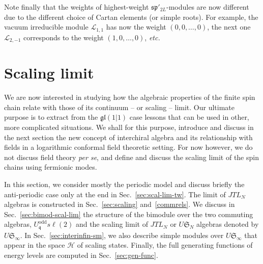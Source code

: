 \documentclass[11pt]{article}
\newcommand{\q}{\mathfrak{q}}
\newcommand{\JTL}[1]{JTL_{#1}}
\newcommand{\LQGodd}{U^{\text{odd}}_{\q} s\ell(2)}
\newcommand{\Hilb}{\mathcal{H}}
\newcommand{\interLie}{\mathfrak{S}}
\newcommand{\interfin}[1]{\interLie_{#1}}
\newcommand{\interinfin}{\interLie_{\infty}}
\newcommand{\gl}{\mathfrak{gl}}
\newcommand{\ssp}{\mathfrak{sp}}
\newcommand{\AIrrTL}[2]{\mathscr{L}_{#1,#2}}
\theoremstyle{definition}
\begin{document}
Note finally that the weights of highest-weight $\ssp'_{2L}$-modules are now different due to the different choice of Cartan elements (or simple roots). For example, the vacuum irreducible module $\AIrrTL{1}{1}$  has now  the weight $(0,0,\dots,0)$, the next one $\AIrrTL{2}{-1}$ corresponds to the weight $(1,0,\dots,0)$, {\it etc.}


\section{Scaling limit}\label{sec:scal-lim}

We are now interested in studying how the algebraic properties of the finite spin chain relate with those of its continuum -- or scaling --  limit. Our ultimate purpose is to extract from the $\gl(1|1)$ case lessons that can be used in other, more complicated situations. We shall for this purpose, introduce and discuss in the next section the new concept of interchiral algebra and its relationship with fields in a logarithmic conformal field theoretic setting. For now however, we do not discuss field theory \textit{per se}, and define and discuss the scaling limit of the spin chains using fermionic modes.

In this section, we consider mostly the periodic model and discuss briefly the anti-periodic case only at the end in Sec.~\ref{sec:scal-lim-tw}.
The limit of $\JTL{N}$ algebras is constructed in Sec.~\ref{sec:scaling} and~\ref{commrels}. We discuss  in Sec.~\ref{sec:bimod-scal-lim} the structure of the bimodule over the two commuting algebras, $\LQGodd$ and the scaling limit of $\JTL{N}$ or $U\interfin{N}$ algebras denoted by $U\interinfin$.
In Sec.~\ref{sec:interinfin-sm}, we also describe  simple  modules over $U\interinfin$ that appear in the space $\Hilb$ of scaling states.
Finally, the full generating functions of energy levels are computed in Sec.~\ref{sec:gen-func}.

\newcommand{\GRSscallim}{4.3~}
\end{document}
